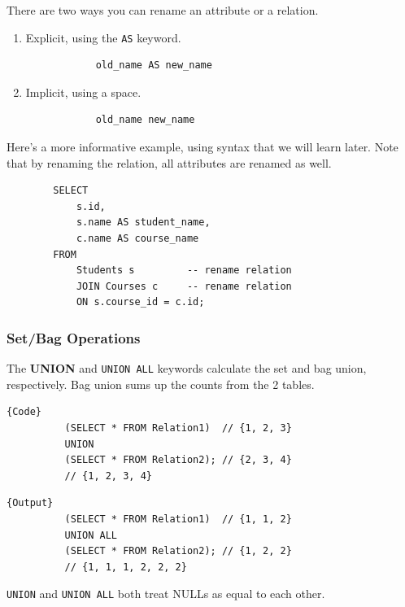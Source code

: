     \begin{definition}[Renaming]
      \label{def:renaming-2}
      There are two ways you can rename an attribute or a relation. 
      \begin{enumerate}
        \item Explicit, using the \texttt{AS} keyword. 
          \begin{lstlisting}
            old_name AS new_name
          \end{lstlisting}
        \item Implicit, using a space. 
          \begin{lstlisting}
            old_name new_name
          \end{lstlisting}
      \end{enumerate}
    \end{definition}

    \begin{example}
      \label{ex:a-first-informative-query}
      Here's a more informative example, using syntax that we will learn later. Note that by renaming the relation, all attributes are renamed as well. 
      \begin{lstlisting}
        SELECT
            s.id, 
            s.name AS student_name,
            c.name AS course_name
        FROM 
            Students s         -- rename relation
            JOIN Courses c     -- rename relation
            ON s.course_id = c.id; 
      \end{lstlisting}
    \end{example}

  \subsubsection{Set/Bag Operations}

    \begin{definition}[Union]
      \label{def:union-2}
      The \textbf{UNION} and \texttt{UNION ALL} keywords calculate the set and bag union, respectively. Bag union sums up the counts from the 2 tables. 

      \noindent\begin{minipage}{.5\textwidth}
        \begin{lstlisting}[]{Code}
          (SELECT * FROM Relation1)  // {1, 2, 3}
          UNION 
          (SELECT * FROM Relation2); // {2, 3, 4}
          // {1, 2, 3, 4}
        \end{lstlisting}
        \end{minipage}
        \hfill
        \begin{minipage}{.49\textwidth}
        \begin{lstlisting}[]{Output}
          (SELECT * FROM Relation1)  // {1, 1, 2}
          UNION ALL 
          (SELECT * FROM Relation2); // {1, 2, 2}
          // {1, 1, 1, 2, 2, 2}
        \end{lstlisting}
      \end{minipage} 
      \texttt{UNION} and \texttt{UNION ALL} both treat NULLs as equal to each other. 
    \end{definition} 

